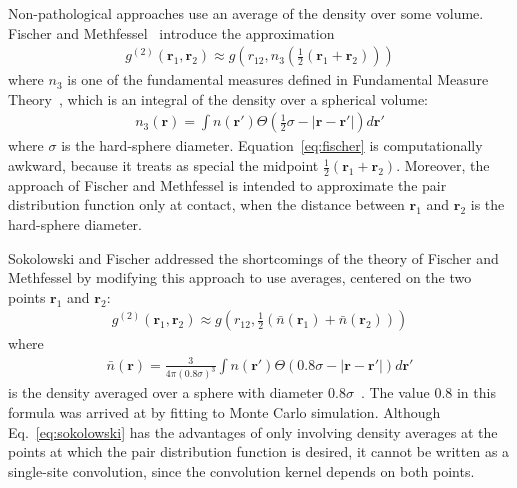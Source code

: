 \documentclass[letterpaper,twocolumn,amsmath,amssymb,pre,aps,10pt]{revtex4-1}
\newcommand{\rr}{\textbf{r}}
\begin{document}
Non-pathological approaches use an average of the density over some
volume. Fischer and Methfessel~\cite{fischer1980born} introduce the
approximation
\begin{align}
  g^{(2)}(\rr_1,\rr_2) \approx g\left(r_{12}, n_3\left(\tfrac12
  (\rr_1+\rr_2)\right)\right)
  \label{eq:fischer}
\end{align}
where $n_3$ is one of the fundamental measures defined in Fundamental
Measure Theory~\cite{rosenfeld1989free}, which is an integral of the
density over a spherical volume:
\begin{align}
  n_3(\rr) = \int n(\rr')\Theta(\tfrac12 \sigma - |\rr-\rr'|) d\rr'
\end{align}
where $\sigma$ is the hard-sphere diameter.  Equation~\ref{eq:fischer}
is computationally awkward, because it treats as special the midpoint
$\tfrac12(\rr_1+\rr_2)$.  Moreover, the approach of Fischer and
Methfessel is intended to approximate the pair distribution function only
at contact, when the distance between $\rr_1$ and $\rr_2$ is the hard-sphere
diameter.

Sokolowski and Fischer addressed the shortcomings of the theory of
Fischer and Methfessel by modifying this approach to use
averages, centered on the two points $\rr_1$ and $\rr_2$:
\begin{align}
  g^{(2)}(\rr_1,\rr_2) \approx g\left(r_{12},
  \tfrac12(\bar{n}(\rr_1)+\bar{n}(\rr_2))\right)
  \label{eq:sokolowski}
\end{align}
where
\begin{align}
  \bar{n}(\rr) = \frac{3}{4\pi (0.8\sigma)^3}\int n(\rr')\Theta(0.8\sigma - |\rr-\rr'|) d\rr'
\end{align}
is the density averaged over a sphere with diameter
$0.8\sigma$~\cite{sokolowski1992role}.  The value 0.8 in this formula
was arrived at by fitting to Monte Carlo simulation.  Although
Eq.~\ref{eq:sokolowski} has the advantages of only involving density
averages at the points at which the pair distribution function is
desired, it cannot be written as a single-site convolution, since the
convolution kernel depends on both points.
\end{document}
